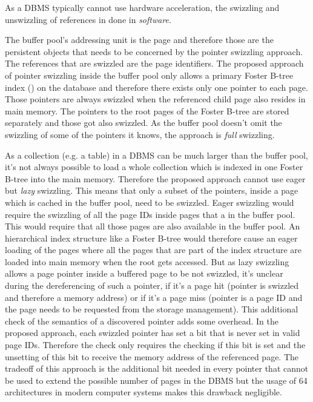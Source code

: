 	As a DBMS typically cannot use hardware acceleration, the swizzling and unswizzling of references in done in \emph{software}.
	
	The buffer pool's addressing unit is the page and therefore those are the persistent objects that needs to be concerned by the pointer swizzling approach. The references that are swizzled are the page identifiers. The proposed approach of pointer swizzling inside the buffer pool only allows a primary Foster B-tree index (\cite{Graefe:2012}) on the database and therefore there exists only one pointer to each page. Those pointers are always swizzled when the referenced child page also resides in main memory. The pointers to the root pages of the Foster B-tree are stored separately and those got also swizzled. As the buffer pool doesn't omit the swizzling of some of the pointers it knows, the approach is \emph{full} swizzling.
	
	As a collection (e.g. a table) in a DBMS can be much larger than the buffer pool, it's not always possible to load a whole collection which is indexed in one Foster B-tree into the main memory. Therefore the proposed approach cannot use eager but \emph{lazy} swizzling. This means that only a subset of the pointers, inside a page which is cached in the buffer pool, need to be swizzled. Eager swizzling would require the swizzling of all the page IDs inside pages that a in the buffer pool. This would require that all those pages are also available in the buffer pool. An hierarchical index structure like a Foster B-tree would therefore cause an eager loading of the pages where all the pages that are part of the index structure are loaded into main memory when the root gets accessed. But as lazy swizzling allows a page pointer inside a buffered page to be not swizzled, it's unclear during the dereferencing of such a pointer, if it's a page hit (pointer is swizzled and therefore a memory address) or if it's a page miss (pointer is a page ID and the page needs to be requested from the storage management). This additional check of the semantics of a discovered pointer adds some overhead. In the proposed approach, each swizzled pointer has set a bit that is never set in valid page IDs. Therefore the check only requires the checking if this bit is set and the unsetting of this bit to receive the memory address of the referenced page. The tradeoff of this approach is the additional bit needed in every pointer that cannot be used to extend the possible number of pages in the DBMS but the usage of \SI{64}{\bit} architectures in modern computer systems makes this drawback negligible.
	
